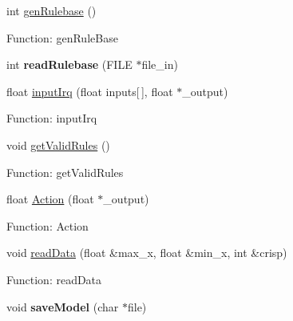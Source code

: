 \begin{DoxyCompactItemize}
\item 
int \hyperlink{classmofs_1_1MOFSModel_a2991bc845158d93913a9fa3e7b15add9}{gen\-Rulebase} ()
\begin{DoxyCompactList}\small\item\em 

 Function\-: gen\-Rule\-Base \end{DoxyCompactList}\item 
\hypertarget{classmofs_1_1MOFSModel_a4adf88c6b4b00096f0b907c5f1e26f3d}{int {\bfseries read\-Rulebase} (F\-I\-L\-E $\ast$file\-\_\-in)}\label{classmofs_1_1MOFSModel_a4adf88c6b4b00096f0b907c5f1e26f3d}

\item 
float \hyperlink{classmofs_1_1MOFSModel_a2ceef293dd6b801d8c4dd1ddd0fe782b}{input\-Irq} (float inputs\mbox{[}$\,$\mbox{]}, float $\ast$\-\_\-output)
\begin{DoxyCompactList}\small\item\em 

 Function\-: input\-Irq \end{DoxyCompactList}\item 
void \hyperlink{classmofs_1_1MOFSModel_a530210aeb55ae24b3d22363cbd2df946}{get\-Valid\-Rules} ()
\begin{DoxyCompactList}\small\item\em 

 Function\-: get\-Valid\-Rules \end{DoxyCompactList}\item 
float \hyperlink{classmofs_1_1MOFSModel_a7b9abe313b9de323845bf0813d658c67}{Action} (float $\ast$\-\_\-output)
\begin{DoxyCompactList}\small\item\em 

 Function\-: Action \end{DoxyCompactList}\item 
void \hyperlink{classmofs_1_1MOFSModel_a4dd54abd79dc44f6bc2b146039568687}{read\-Data} (float \&max\-\_\-x, float \&min\-\_\-x, int \&crisp)
\begin{DoxyCompactList}\small\item\em 

 Function\-: read\-Data \end{DoxyCompactList}\item 
\hypertarget{classmofs_1_1MOFSModel_a21296b57f7e479ee2806a23b3fcaadcd}{void {\bfseries save\-Model} (char $\ast$file)}\label{classmofs_1_1MOFSModel_a21296b57f7e479ee2806a23b3fcaadcd}


\end{DoxyCompactItemize}
